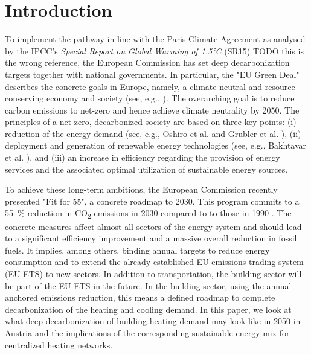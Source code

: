 \section{Introduction}
To implement the pathway in line with the Paris Climate Agreement \cite{agreement2015paris} as analysed by the IPCC's \emph{Special Report on Global Warming of 1.5°C} (SR15) \cite{edenhofer2011ipcc} TODO this is the wrong reference, the European Commission has set deep decarbonization targets together with national governments. In particular, the "EU Green Deal" describes the concrete goals in Europe, namely, a climate-neutral and resource-conserving economy and society (see, e.g., \cite{kemfert2019green}). The overarching goal is to reduce carbon emissions to net-zero and hence achieve climate neutrality by 2050. The principles of a net-zero, decarbonized society are based on three key points: (i) reduction of the energy demand (see, e.g., Oshiro et al. \cite{oshiro2021enabling} and Grubler et al. \cite{grubler2018low}), (ii) deployment and generation of renewable energy technologies (see, e.g., Bakhtavar et al. \cite{bakhtavar2020assessment}), and (iii) an increase in efficiency regarding the provision of energy services and the associated optimal utilization of sustainable energy sources.\vspace{0.3cm}

To achieve these long-term ambitions, the European Commission recently presented "Fit for 55", a concrete roadmap to 2030. This program commits to a \SI{55}{\%} reduction in CO\textsubscript{2} emissions in 2030 compared to to those in 1990 \cite{european_commission_european_2019}. The concrete measures affect almost all sectors of the energy system and should lead to a significant efficiency improvement and a massive overall reduction in fossil fuels. It implies, among others, binding annual targets to reduce energy consumption and to extend the already established EU emissions trading system (EU ETS) to new sectors. In addition to transportation, the building sector will be part of the EU ETS in the future. In the building sector, using the annual anchored emissions reduction, this means a defined roadmap to complete decarbonization of the heating and cooling demand. In this paper, we look at what deep decarbonization of building heating demand may look like in 2050 in Austria and the implications of the corresponding sustainable energy mix for centralized heating networks.

